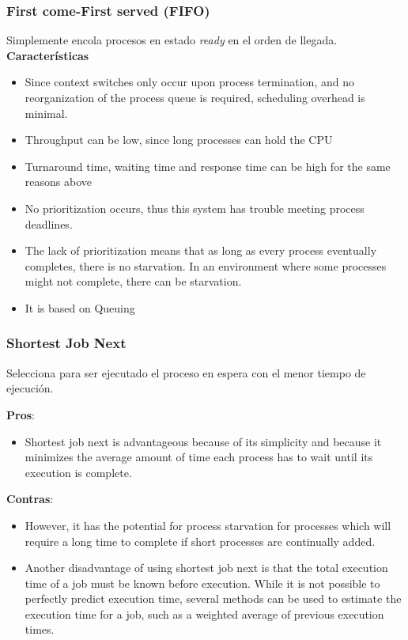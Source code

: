 \documentclass[a4paper, twoside]{article}
\begin{document}
\subsubsection{First come-First served (FIFO)}
Simplemente encola procesos en estado \emph{ready} en el orden de llegada.\\

\textbf{Características}

\begin{itemize}
	\item Since context switches only occur upon process termination, and no reorganization of the process queue is required, scheduling overhead is minimal.
	\item Throughput can be low, since long processes can hold the CPU
	\item Turnaround time, waiting time and response time can be high for the same reasons above
	\item No prioritization occurs, thus this system has trouble meeting process deadlines.
	\item The lack of prioritization means that as long as every process eventually completes, there is no starvation. In an environment where some processes might not complete, there can be starvation.
	\item It is based on Queuing
\end{itemize}

\subsubsection{Shortest Job Next}
Selecciona para ser ejecutado el proceso en espera con el menor tiempo de ejecución.

\textbf{Pros}:
\begin{itemize}
	\item Shortest job next is advantageous because of its simplicity and because it minimizes the average amount of time each process has to wait until its execution is complete. 
\end{itemize}

\textbf{Contras}:
\begin{itemize}
	\item However, it has the potential for process starvation for processes which will require a long time to complete if short processes are continually added.
	\item Another disadvantage of using shortest job next is that the total execution time of a job must be known before execution. While it is not possible to perfectly predict execution time, several methods can be used to estimate the execution time for a job, such as a weighted average of previous execution times.
\end{itemize}
\end{document}
